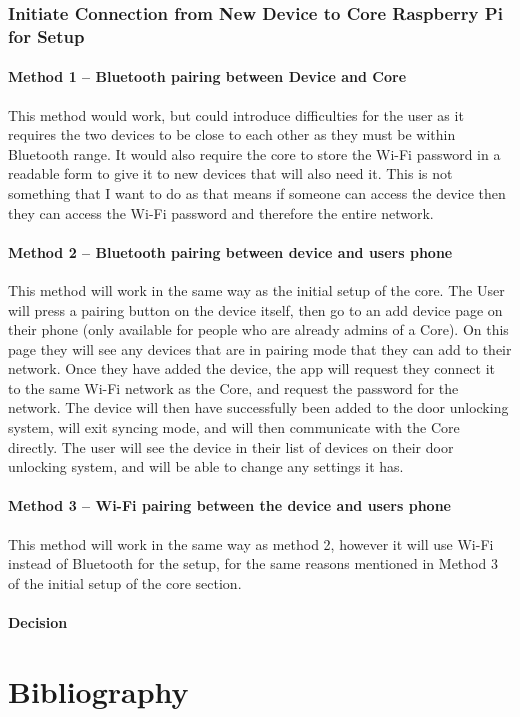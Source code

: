\documentclass[10pt, a4paper]{article}
\begin{document}
\subsubsection{Initiate Connection from New Device to Core Raspberry Pi for Setup}

\paragraph{Method 1 – Bluetooth pairing between Device and Core}
This method would work, but could introduce difficulties for the user as it requires the two devices to be close to each other as they must be within Bluetooth range. It would also require the core to store the Wi-Fi password in a readable form to give it to new devices that will also need it. This is not something that I want to do as that means if someone can access the device then they can access the Wi-Fi password and therefore the entire network.

\paragraph{Method 2 – Bluetooth pairing between device and users phone}
This method will work in the same way as the initial setup of the core. The User will press a pairing button on the device itself, then go to an add device page on their phone (only available for people who are already admins of a Core). On this page they will see any devices that are in pairing mode that they can add to their network. Once they have added the device, the app will request they connect it to the same Wi-Fi network as the Core, and request the password for the network. The device will then have successfully been added to the door unlocking system, will exit syncing mode, and will then communicate with the Core directly. The user will see the device in their list of devices on their door unlocking system, and will be able to change any settings it has.

\paragraph{Method 3 – Wi-Fi pairing between the device and users phone}
This method will work in the same way as method 2, however it will use Wi-Fi instead of Bluetooth for the setup, for the same reasons mentioned in Method 3 of the initial setup of the core section.

\paragraph{Decision}

\newpage
\section{Bibliography}



\newpage
\listoftodos[Notes]
\end{document}
